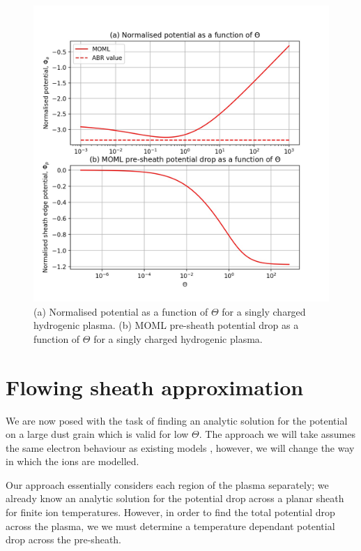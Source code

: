 \documentclass{article}
\begin{document}
    
\begin{figure}[H]
\centering
\includegraphics[width=\linewidth]{Output/MOMLvsABR.jpeg}
\caption{(a) Normalised potential as a function of $\Theta$ for a singly charged hydrogenic plasma. 
(b) MOML pre-sheath potential drop as a function of $\Theta$ for a singly charged hydrogenic plasma.}
\label{MOMLvsABR} 
\end{figure}

\newpage

\section{Flowing sheath approximation}

We are now posed with the task of finding an analytic solution for the
potential on a large dust grain which is valid for low $\Theta$. The approach we will
take assumes the same electron behaviour as existing models \cite{Willis}, however, we will
change the way in which the ions are modelled.

\smallskip

Our approach essentially considers each region of the plasma separately; we
already know an analytic solution for the potential drop across a planar sheath
for finite ion temperatures. However, in order to find the total potential drop across the plasma, we 
we must determine a temperature dependant potential drop across the pre-sheath.
\end{document}
